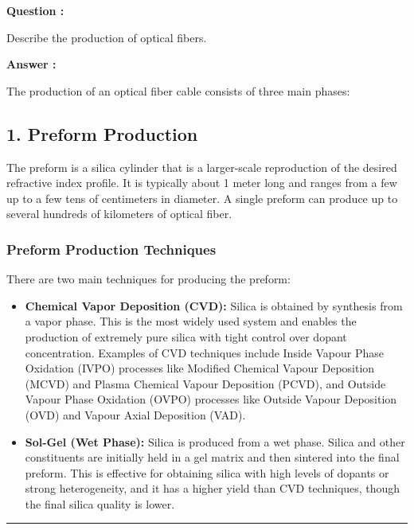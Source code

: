 \documentclass[a4paper,11pt]{book}
\newcounter{qacount}
\newenvironment{question}{
  \refstepcounter{qacount}
  \vspace{1em} %
  \noindent\textbf{Question \theqacount:}\space
}{
  \par %
}
\newenvironment{answer}{
  \noindent\textbf{Answer \theqacount:}\space
}{
  \par\vspace{1em}   %
  \hrule             %
  \vspace{0.5em}     %
}
\begin{document}
\begin{question}
    Describe the production of optical fibers.
\end{question}

\begin{answer}
    The production of an optical fiber cable consists of three main phases:

    \subsection*{1. Preform Production}
    The preform is a silica cylinder that is a larger-scale reproduction of the desired refractive index profile. It is typically about 1 meter long and ranges from a few up to a few tens of centimeters in diameter. A single preform can produce up to several hundreds of kilometers of optical fiber.

    \subsubsection*{Preform Production Techniques}
    There are two main techniques for producing the preform:
    \begin{itemize}
        \item \textbf{Chemical Vapor Deposition (CVD):} Silica is obtained by synthesis from a vapor phase. This is the most widely used system and enables the production of extremely pure silica with tight control over dopant concentration. Examples of CVD techniques include Inside Vapour Phase Oxidation (IVPO) processes like Modified Chemical Vapour Deposition (MCVD) and Plasma Chemical Vapour Deposition (PCVD), and Outside Vapour Phase Oxidation (OVPO) processes like Outside Vapour Deposition (OVD) and Vapour Axial Deposition (VAD).
        \item \textbf{Sol-Gel (Wet Phase):} Silica is produced from a wet phase. Silica and other constituents are initially held in a gel matrix and then sintered into the final preform. This is effective for obtaining silica with high levels of dopants or strong heterogeneity, and it has a higher yield than CVD techniques, though the final silica quality is lower.
    \end{itemize}


\end{answer}
\end{document}
